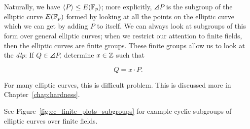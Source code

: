 \noindent
Naturally, we have $\left\langle P \right\rangle\le E(\mathbb{F}_{p})$;
more explicitly, $\angles{P}$ is the \gls{subgroup}
of the \gls{elliptic curve} $E(\mathbb{F}_{p})$
formed by looking at all the points on the \gls{elliptic curve}
which we can get by adding $P$ to itself.
We can always look at \glspl{subgroup} of this form over general
\glspl{elliptic curve};
when we restrict our attention to \glspl{finite field},
then the \glspl{elliptic curve} are \glspl{finite group}.
These \glspl{finite group} allow us to look at the
\emph{\gls{dlp}}:
If $Q \in \angles{P}$, determine $x\in\mathbb{Z}$ such that

\begin{equation}
    Q = x\cdot P.
\end{equation}

\noindent
For many \glspl{elliptic curve}, this is difficult problem.
This is discussed more in Chapter~\ref{chap:hardness}.

See Figure~\ref{fig:ec_finite_plots_subgroups}
for example cyclic subgroups of \glspl{elliptic curve} over
\glspl{finite field}.



